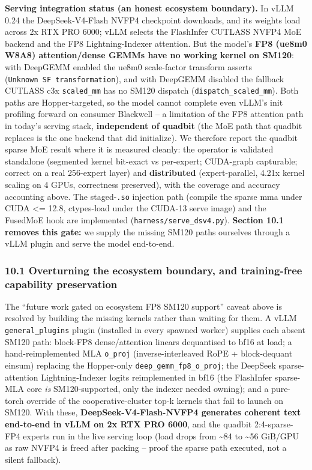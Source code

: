 \documentclass[
]{article}
\begin{document}
\textbf{Serving integration status (an honest ecosystem boundary).} In
vLLM 0.24 the DeepSeek-V4-Flash NVFP4 checkpoint downloads, and its
weights load across 2x RTX PRO 6000; vLLM selects the FlashInfer CUTLASS
NVFP4 MoE backend and the FP8 Lightning-Indexer attention. But the
model's \textbf{FP8 (ue8m0 W8A8) attention/dense GEMMs have no working
kernel on SM120}: with DeepGEMM enabled the ue8m0 scale-factor transform
asserts (\texttt{Unknown\ SF\ transformation}), and with DeepGEMM
disabled the fallback CUTLASS c3x \texttt{scaled\_mm} has no SM120
dispatch (\texttt{dispatch\_scaled\_mm}). Both paths are
Hopper-targeted, so the model cannot complete even vLLM's init profiling
forward on consumer Blackwell -- a limitation of the FP8 attention path
in today's serving stack, \textbf{independent of quadbit} (the MoE path
that quadbit replaces is the one backend that did initialize). We
therefore report the quadbit sparse MoE result where it is measured
cleanly: the operator is validated standalone (segmented kernel
bit-exact vs per-expert; CUDA-graph capturable; correct on a real
256-expert layer) and \textbf{distributed} (expert-parallel, 4.21x
kernel scaling on 4 GPUs, correctness preserved), with the coverage and
accuracy accounting above. The staged-\texttt{.so} injection path
(compile the sparse mma under CUDA \textless= 12.8, ctypes-load under
the CUDA-13 serve image) and the FusedMoE hook are implemented
(\texttt{harness/serve\_dsv4.py}). \textbf{Section 10.1 removes this
gate:} we supply the missing SM120 paths ourselves through a vLLM plugin
and serve the model end-to-end.

\subsubsection{10.1 Overturning the ecosystem boundary, and
training-free capability
preservation}\label{overturning-the-ecosystem-boundary-and-training-free-capability-preservation}

The ``future work gated on ecosystem FP8 SM120 support'' caveat above is
resolved by building the missing kernels rather than waiting for them. A
vLLM \texttt{general\_plugins} plugin (installed in every spawned
worker) supplies each absent SM120 path: block-FP8 dense/attention
linears dequantised to bf16 at load; a hand-reimplemented MLA
\texttt{o\_proj} (inverse-interleaved RoPE + block-dequant einsum)
replacing the Hopper-only \texttt{deep\_gemm\_fp8\_o\_proj}; the
DeepSeek sparse-attention Lightning-Indexer logits reimplemented in bf16
(the FlashInfer sparse-MLA core \emph{is} SM120-supported, only the
indexer needed owning); and a pure-torch override of the
cooperative-cluster top-k kernels that fail to launch on SM120. With
these, \textbf{DeepSeek-V4-Flash-NVFP4 generates coherent text
end-to-end in vLLM on 2x RTX PRO 6000}, and the quadbit 2:4-sparse-FP4
experts run in the live serving loop (load drops from \textasciitilde84
to \textasciitilde56 GiB/GPU as raw NVFP4 is freed after packing --
proof the sparse path executed, not a silent fallback).
\end{document}
